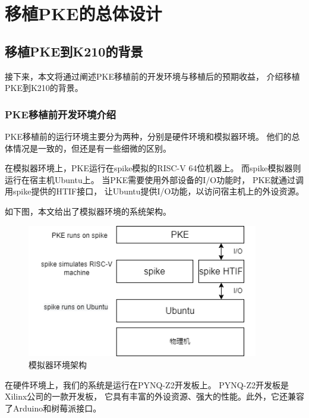 
\chapter{移植PKE的总体设计}

\section{移植PKE到K210的背景}

接下来，本文将通过阐述PKE移植前的开发环境与移植后的预期收益，
介绍移植PKE到K210的背景。

\subsection{PKE移植前开发环境介绍}

PKE移植前的运行环境主要分为两种，分别是硬件环境和模拟器环境。
他们的总体情况是一致的，但还是有一些细微的区别。

在模拟器环境上，PKE运行在spike模拟的RISC-V 64位机器上。
而spike模拟器则运行在宿主机Ubuntu上。
当PKE需要使用外部设备的I/O功能时，
PKE就通过调用spike提供的HTIF接口，
让Ubuntu提供I/O功能，以访问宿主机上的外设资源\cite{PKE_doc_GitHub}。

如下图，本文给出了模拟器环境的系统架构。

\begin{figure}[htbp]
    \vspace{13pt} %
    \centering
    \includegraphics[width=0.9\textwidth]{images/spike_structure.png}
    \caption{模拟器环境架构}\label{模拟器环境架构} %
\end{figure}

在硬件环境上，我们的系统是运行在PYNQ-Z2开发板上。
PYNQ-Z2开发板是Xilinx公司的一款开发板，
它具有丰富的外设资源、强大的性能。此外，它还兼容了Arduino和树莓派接口。

